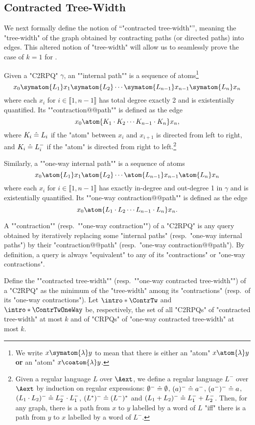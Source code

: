 \subsection{\AP{}Contracted Tree-Width}
We next formally define the notion of ``"contracted tree-width"'', meaning the "tree-width" of the graph obtained by contracting paths (or directed paths) into edges. This altered notion of "tree-width" will allow us to seamlessly prove the case of $k=1$ for .

\AP Given a "C2RPQ" $\gamma$, an \AP""internal path"" is a sequence of atoms\footnote{We write
$x \symatom{\lambda} y$ to mean that there is either an "atom" $x \atom{\lambda} y$
\textbf{or} an "atom" $x \coatom{\lambda} y$.}
\[
	x_0 \symatom{L_1} x_1 \symatom{L_2} \cdots \symatom{L_{n-1}} x_{n-1} \symatom{L_n} x_n
\]
where each $x_i$ for $i \in \lBrack 1,n-1 \rBrack$ has total degree
exactly 2 and is existentially quantified.
\AP Its ""contraction@@path"" is defined as the edge
\[
	x_0 \atom{K_1 \cdot K_2 \cdots K_{n-1} \cdot K_n} x_n,
\]
where $K_i \mathrel{\hat{=}} L_i$ if the "atom" between $x_i$ and $x_{i+1}$ is directed from
left to right, and $K_i \mathrel{\hat{=}} L_i^{-}$ if the "atom" is directed from right to left.\footnote{Given a regular language $L$ over $\Aext$, we define a regular language $L^-$ over $\Aext$ by induction on regular expressions: $\emptyset^- \mathrel{\hat{=}} \emptyset$, $(a)^- \mathrel{\hat{=}} a^-$, $(a^-)^- \mathrel{\hat{=}} a$, $(L_1\cdot L_2)^- \mathrel{\hat{=}} L_2^- \cdot L_1^-$, $(L^*)^- \mathrel{\hat{=}} (L^-)^*$ and $(L_1 + L_2)^- \mathrel{\hat{=}} L_1^- + L_2^-$. Then, for any graph, there is a path from $x$ to $y$ labelled by
a word of $L$ "iff" there is a path from $y$ to $x$ labelled by a word of $L^-$.}

\AP Similarly, a ""one-way internal path"" is a sequence of atoms 
\[
	x_0 \atom{L_1} x_1 \atom{L_2} \cdots \atom{L_{n-1}} x_{n-1} \atom{L_n} x_n
\]
where each $x_i$ for $i \in \lBrack 1,n-1 \rBrack$ has exactly in-degree
and out-degree 1 in $\gamma$ and is existentially quantified.
\AP Its ""one-way contraction@@path"" is defined as the edge
\[
	x_0 \atom{L_1 \cdot L_2 \cdots L_{n-1} \cdot L_n} x_n.
\]

\AP A ""contraction"" (resp.\ ""one-way contraction"") of a "C2RPQ" is any query obtained
by iteratively replacing some "internal paths" (resp.\ "one-way internal paths") by
their "contraction@@path" (resp.\ "one-way contraction@@path"). By definition,
a query is always "equivalent" to any of its "contractions" or "one-way contractions".

\begin{definition}
	\AP
	Define the ""contracted tree-width"" (resp.\ ""one-way contracted tree-width"")
	of a "C2RPQ" as the minimum of the "tree-width" among its "contractions" (resp.\ of its "one-way contractions"). Let $\intro*\ContrTw$ and $\intro*\ContrTwOneWay$ be, respectively, the set of all "C2RPQs" of "contracted tree-width" at most $k$ and of "CRPQs" of "one-way contracted tree-width" at most $k$.
\end{definition}

